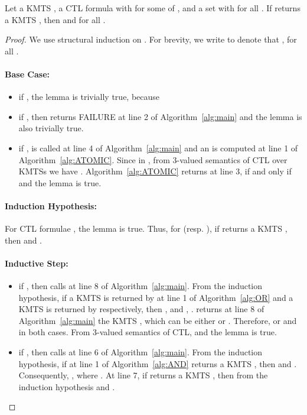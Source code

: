 \begin{lem}
\label{theor:sound_help}
Let a KMTS , a CTL formula  with  for some  of , and a set  with  for all 
.  If  returns a KMTS , then  and  for all .
\end{lem}
\begin{proof}
We use structural induction on .  For brevity, we write  
to denote that , 
for all .  

\paragraph{Base Case: }
\begin{itemize}
\item if , the lemma is trivially true, because     
\item if , then  
returns FAILURE at line 2 of Algorithm~\ref{alg:main} and the lemma is also trivially true. 
\item if ,  is called at line 4 of Algorithm~\ref{alg:main} and an  is computed 
at line 1 of Algorithm~\ref{alg:ATOMIC}.  Since  in ,  
from 3-valued semantics of CTL over KMTSs we have .  Algorithm~\ref{alg:ATOMIC} returns  at line 3, if and only if  and the lemma is true.     
\end{itemize}

\paragraph{Induction Hypothesis:} For CTL formulae , the lemma is true.  Thus, for  (resp. ), if  returns a KMTS , then  and .    

\paragraph{Inductive Step:}
\begin{itemize}
\item if , then  calls  at line 8 of Algorithm~\ref{alg:main}.     From the induction hypothesis, if a KMTS  is returned by  at line 1 of Algorithm~\ref{alg:OR} and a KMTS  is returned by  respectively, then ,  and , .   returns at line 8 of Algorithm~\ref{alg:main} the KMTS , which can be either  or .  Therefore,  or  and  in both cases.  From 3-valued semantics of CTL,  and the lemma is true. 

\item if , then 
 calls 
 at line 6 of 
Algorithm~\ref{alg:main}.  From the induction hypothesis, if at line 1 of Algorithm~\ref{alg:AND}  returns a KMTS , then 
 and .  Consequently, , where .  At line 7, if  returns a KMTS , then from the induction hypothesis  and .


\end{itemize}
\end{proof}
